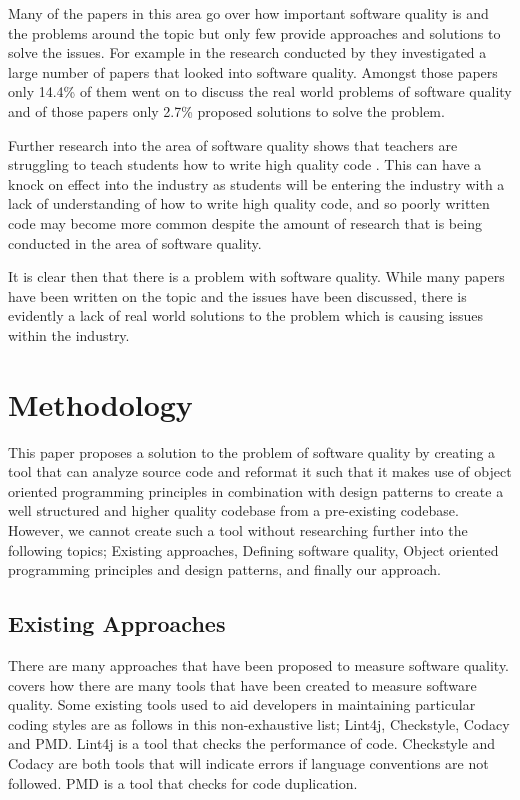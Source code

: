 \documentclass{article} %
\begin{document}
Many of the papers in this area go over how important software quality is and the problems around the topic but only few provide approaches and solutions to solve the issues. For example in the research conducted by \cite{6606742} they investigated a large number of papers that looked into software quality. Amongst those papers only 14.4\% of them went on to discuss the real world problems of software quality and of those papers only 2.7\% proposed solutions to solve the problem.

Further research into the area of software quality shows that teachers are struggling to teach students how to write high quality code \citep{10.1145/3428029.3428047}. This can have a knock on effect into the industry as students will be entering the industry with a lack of understanding of how to write high quality code, and so poorly written code may become more common despite the amount of research that is being conducted in the area of software quality.

It is clear then that there is a problem with software quality. While many papers have been written on the topic and the issues have been discussed, there is evidently a lack of real world solutions to the problem which is causing issues within the industry.

\section{Methodology}

This paper proposes a solution to the problem of software quality by creating a tool that can analyze source code and reformat it such that it makes use of object oriented programming principles in combination with design patterns to create a well structured and higher quality codebase from a pre-existing codebase.
However, we cannot create such a tool without researching further into the following topics; Existing approaches, Defining software quality, Object oriented programming principles and design patterns, and finally our approach.

\subsection{Existing Approaches}
There are many approaches that have been proposed to measure software quality. \cite{8681007} covers how there are many tools that have been created to measure software quality. Some existing tools used to aid developers in maintaining particular coding styles are as follows in this non-exhaustive list; Lint4j, Checkstyle, Codacy and PMD.
Lint4j is a tool that checks the performance of code. Checkstyle and Codacy are both tools that will indicate errors if language conventions are not followed. PMD is a tool that checks for code duplication.
\end{document}

